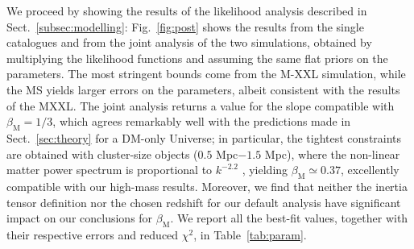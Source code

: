\documentclass[a4paper,fleqn,usenatbib]{mnras}
\begin{document}
We proceed by showing the results of the likelihood analysis described in Sect.~\ref{subsec:modelling}: 
Fig.~\ref{fig:post}\protect{} shows the results from the single catalogues and from the joint analysis of the two simulations, obtained by multiplying the likelihood functions and assuming the same flat priors on the parameters. The most stringent bounds come from the M-XXL simulation, while the MS yields larger errors on the parameters, albeit consistent with the results of the MXXL. The joint analysis returns a value for the slope compatible with $\beta_{\mathrm{M}} = 1/3$, which agrees remarkably well with the predictions made in Sect.~\ref{sec:theory} for a DM-only Universe; in particular, the tightest constraints are obtained with cluster-size objects ($0.5$ Mpc$-1.5$ Mpc), where the non-linear matter power spectrum is proportional to $k^{-2.2}$ \citep{Blasetal2011}, yielding $\beta_{\mathrm{M}} \simeq 0.37$, excellently compatible with our high-mass results. Moreover, we find that neither the inertia tensor definition nor the chosen redshift for our default analysis have significant impact on our conclusions for $\beta_{\mathrm{M}}$. We report all the best-fit values, together with their respective errors and reduced $\chi^2$, in Table~\ref{tab:param}.
\end{document}
